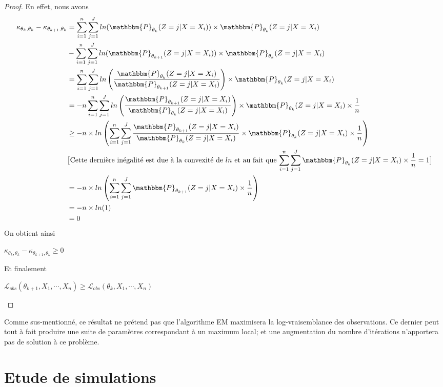 \documentclass[frenchb]{report}
\newcommand{\1}{\mathbbm{1}}
\newcommand{\prob}{\mathbbm{P}}
\newcommand{\lv}{\mathcal{L}}
\theoremstyle{definition}\newtheorem{defn}{Définition}
\theoremstyle{definition}\newtheorem{exm}{Exemple}
\theoremstyle{definition}\newtheorem{nota}{Notation}
\theoremstyle{definition}\newtheorem{rem}{Remarque}
\begin{document}
\begin{proof}
En effet, nous avons
\begin{align*}
\kappa_{\theta_{k}, \theta_k}-\kappa_{\theta_{k+1}, \theta_k} &= \sum_{i=1}^n\sum_{j=1}^J ln(\prob_{\theta_k}(Z = j|X=X_i))\times\prob_{\theta_k}(Z = j|X = X_i) \\
&- \sum_{i=1}^n \sum_{j=1}^J ln(\prob_{\theta_{k+1}}(Z = j|X=X_i))\times\prob_{\theta_k}(Z = j|X = X_i) \\
&=\sum_{i=1}^n \sum_{j=1}^J ln\left(\frac{\prob_{\theta_k}(Z = j|X=X_i)}{\prob_{\theta_{k+1}}(Z = j|X=X_i)}\right)\times\prob_{\theta_k}(Z = j|X = X_i)\\
&= - n\sum_{i=1}^n \sum_{j=1}^J ln\left(\frac{\prob_{\theta_{k+1}}(Z = j|X=X_i)}{\prob_{\theta_k}(Z = j|X=X_i)}\right)\times\prob_{\theta_k}(Z = j|X = X_i)\times\frac{1}{n}\\
&\geq -n\times ln\left( \sum_{i=1}^n\sum_{j=1}^J \frac{\prob_{\theta_{k+1}}(Z = j|X=X_i)}{\prob_{\theta_k}(Z = j|X=X_i)}\times\prob_{\theta_k}(Z = j|X = X_i)\times\frac{1}{n} \right)\\
&\text{$\big[$Cette dernière inégalité est due à la convexité de $ln$ et au fait que $\displaystyle\sum_{i=1}^n\sum_{j=1}^J\prob_{\theta_k}(Z = j|X=X_i)\times\frac{1}{n}=1\big]$}\\
&= - n\times ln\left( \sum_{i=1}^n\sum_{j=1}^J\prob_{\theta_{k+1}}(Z = j|X=X_i)\times\frac{1}{n}\right)\\
&=  -n\times ln(1)\\
&= 0
\end{align*}
On obtient ainsi
\begin{center} $\kappa_{\theta_{k}, \theta_k}-\kappa_{\theta_{k+1}, \theta_k} \geq 0$ \end{center}
Et finalement
\begin{center} $\lv_{obs}(\theta_{k+1}, X_1, \cdots, X_n) \geq \lv_{obs}(\theta_k, X_1, \cdots, X_n)$ \end{center}
\end{proof}

Comme sus-mentionné, ce résultat ne prétend pas que l'algorithme EM maximisera la log-vraisemblance des observations. Ce dernier peut tout à fait produire une suite de paramètres correspondant à un maximum local; et une augmentation du nombre d'itérations n'apportera pas de solution à ce problème.
\newpage


\chapter{Etude de simulations}
\end{document}
